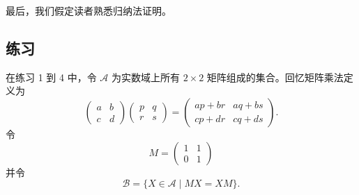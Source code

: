 最后，我们假定读者熟悉归纳法证明。

\subsection*{练习}

在练习 1 到 4 中，令 $\mathcal{A}$ 为实数域上所有 $2\times2$ 矩阵组成的集合。回忆矩阵乘法定义为
\[
  \begin{pmatrix}a&b\\ c&d\end{pmatrix}
  \begin{pmatrix}p&q\\ r&s\end{pmatrix}
  =
  \begin{pmatrix}ap+br&aq+bs\\ cp+dr&cq+ds\end{pmatrix}.
\]
令
\[
  M=\begin{pmatrix}1&1\\0&1\end{pmatrix}
\]
并令
\[
  \mathcal{B}=\{X\in\mathcal{A}\mid MX=XM\}.
\]
